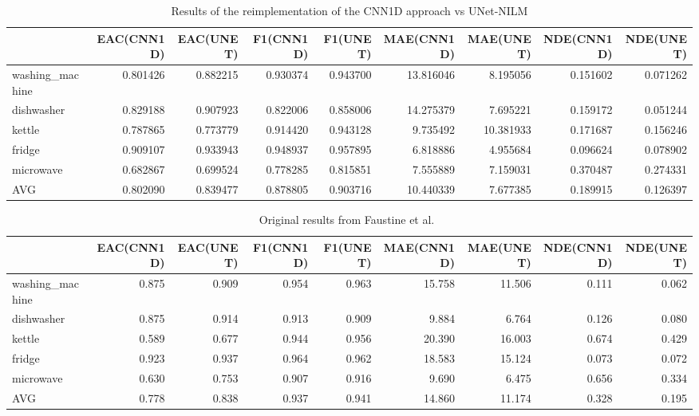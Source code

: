 \documentclass[sigconf]{acmart}
\begin{document}
\begin{table}
  \caption{Results of the reimplementation of the CNN1D approach vs UNet-NILM}
  \label{tab:unetvscnn1d}
  \begin{tabular}{lrrrrrrrr}
    \toprule
    {} &  EAC(CNN1D) &  EAC(UNET) &  F1(CNN1D) &  F1(UNET) &  MAE(CNN1D) &  MAE(UNET) &  NDE(CNN1D) &  NDE(UNET) \\
    \midrule
    washing\_machine &    0.801426 &   0.882215 &   0.930374 &  0.943700 &   13.816046 &   8.195056 &    0.151602 &   0.071262 \\
    dishwasher      &    0.829188 &   0.907923 &   0.822006 &  0.858006 &   14.275379 &   7.695221 &    0.159172 &   0.051244 \\
    kettle          &    0.787865 &   0.773779 &   0.914420 &  0.943128 &    9.735492 &  10.381933 &    0.171687 &   0.156246 \\
    fridge          &    0.909107 &   0.933943 &   0.948937 &  0.957895 &    6.818886 &   4.955684 &    0.096624 &   0.078902 \\
    microwave       &    0.682867 &   0.699524 &   0.778285 &  0.815851 &    7.555889 &   7.159031 &    0.370487 &   0.274331 \\
    AVG             &    0.802090 &   0.839477 &   0.878805 &  0.903716 &   10.440339 &   7.677385 &    0.189915 &   0.126397 \\
    \bottomrule
    \end{tabular}    
\end{table}

\begin{table}
  \caption{Original results from Faustine et al.~\cite{unetnilm}}
  \label{tab:orginalpaperresults}
  \begin{tabular}{lrrrrrrrr}
    \toprule
    {} &  EAC(CNN1D) &  EAC(UNET) &  F1(CNN1D) &  F1(UNET) &  MAE(CNN1D) &  MAE(UNET) &  NDE(CNN1D) &  NDE(UNET) \\
    \midrule
    washing\_machine &       0.875 &      0.909 &      0.954 &     0.963 &      15.758 &     11.506 &       0.111 &      0.062 \\
    dishwasher      &       0.875 &      0.914 &      0.913 &     0.909 &       9.884 &      6.764 &       0.126 &      0.080 \\
    kettle          &       0.589 &      0.677 &      0.944 &     0.956 &      20.390 &     16.003 &       0.674 &      0.429 \\
    fridge          &       0.923 &      0.937 &      0.964 &     0.962 &      18.583 &     15.124 &       0.073 &      0.072 \\
    microwave       &       0.630 &      0.753 &      0.907 &     0.916 &       9.690 &      6.475 &       0.656 &      0.334 \\
    AVG             &       0.778 &      0.838 &      0.937 &     0.941 &      14.860 &     11.174 &       0.328 &      0.195 \\
    \bottomrule
    \end{tabular}
\end{table}
\end{document}
